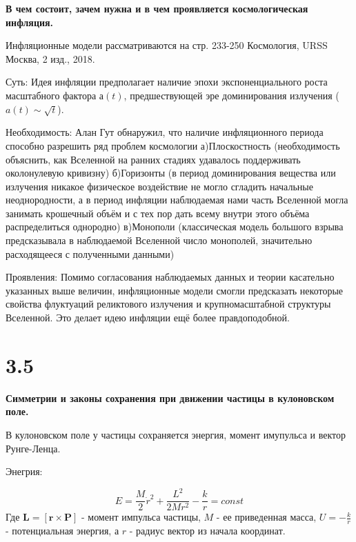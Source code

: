 \documentclass[a4paper,14pt]{article}
\begin{document}
\begin{center}
	\LARGE{\textbf{В чем состоит, зачем нужна и в чем проявляется космологическая инфляция.}}\\
\end{center}

Инфляционные модели рассматриваются на стр. 233-250 Космология, URSS Москва, 2 изд., 2018.

Суть:
Идея инфляции предполагает наличие эпохи экспоненциального роста масштабного фактора $а(t)$, предшествующей эре доминирования излучения ($a(t)\sim\sqrt{t}$).

Необходимость:
Алан Гут обнаружил, что наличие инфляционного периода способно разрешить ряд проблем космологии
а)Плоскостность (необходимость объяснить, как Вселенной на ранних стадиях удавалось поддерживать околонулевую кривизну)
б)Горизонты (в период доминирования вещества или излучения никакое физическое воздействие не могло сгладить начальные неоднородности, а в период инфляции наблюдаемая нами часть Вселенной могла занимать крошечный объём и с тех пор дать всему внутри этого объёма распределиться однородно)
в)Монополи (классическая модель большого взрыва предсказывала в наблюдаемой Вселенной число монополей, значительно расходящееся с полученными данными)

Проявления:
Помимо согласования наблюдаемых данных и теории касательно указанных выше величин, инфляционные модели смогли предсказать некоторые свойства флуктуаций реликтового излучения и крупномасштабной структуры Вселенной.
Это делает идею инфляции ещё более правдоподобной.

\section*{3.5}

\begin{center}
	\LARGE{\textbf{Симметрии и законы сохранения при движении частицы в кулоновском поле.}}\\
\end{center}

В кулоновском поле у частицы сохраняется энергия, момент имупульса и вектор Рунге-Ленца. 

Энегрия: 

\begin{equation*}
E = \frac{M}{2} \dot{r}^2 + \frac{L^2}{2Mr^2} - \frac{k}{r} = const
\end{equation*}
Где $\mathbf {L} = [\mathbf r \times \mathbf P ]$ - момент импульса частицы, $M$ - ее приведенная масса, $U = - \frac{k}{r}$ - потенциальная энергия, а $r$ - радиус вектор из начала координат. 
\end{document}
